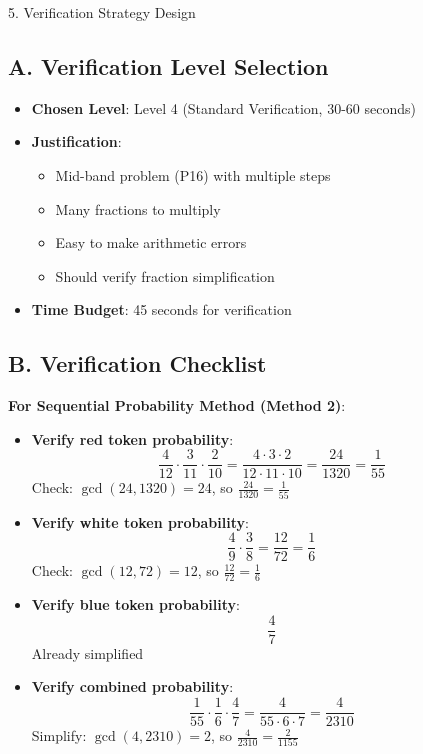 \documentclass[12pt]{article}
\begin{document}
\begin{verificationbox}{5. Verification Strategy Design}

\subsection*{A. Verification Level Selection}
\begin{itemize}[leftmargin=*]
    \item \textbf{Chosen Level}: Level 4 (Standard Verification, 30-60 seconds)
    
    \item \textbf{Justification}: 
    \begin{itemize}
        \item Mid-band problem (P16) with multiple steps
        \item Many fractions to multiply
        \item Easy to make arithmetic errors
        \item Should verify fraction simplification
    \end{itemize}
    
    \item \textbf{Time Budget}: 45 seconds for verification
\end{itemize}

\subsection*{B. Verification Checklist}

\textbf{For Sequential Probability Method (Method 2)}:
\begin{itemize}
    \item \textbf{Verify red token probability}:
    \[\frac{4}{12} \cdot \frac{3}{11} \cdot \frac{2}{10} = \frac{4 \cdot 3 \cdot 2}{12 \cdot 11 \cdot 10} = \frac{24}{1320} = \frac{1}{55}\]
    Check: $\gcd(24, 1320) = 24$, so $\frac{24}{1320} = \frac{1}{55}$ \checkmark
    
    \item \textbf{Verify white token probability}:
    \[\frac{4}{9} \cdot \frac{3}{8} = \frac{12}{72} = \frac{1}{6}\]
    Check: $\gcd(12, 72) = 12$, so $\frac{12}{72} = \frac{1}{6}$ \checkmark
    
    \item \textbf{Verify blue token probability}:
    \[\frac{4}{7}\]
    Already simplified \checkmark
    
    \item \textbf{Verify combined probability}:
    \[\frac{1}{55} \cdot \frac{1}{6} \cdot \frac{4}{7} = \frac{4}{55 \cdot 6 \cdot 7} = \frac{4}{2310}\]
    Simplify: $\gcd(4, 2310) = 2$, so $\frac{4}{2310} = \frac{2}{1155}$ \checkmark
    

\end{itemize}
\end{verificationbox}
\end{document}
